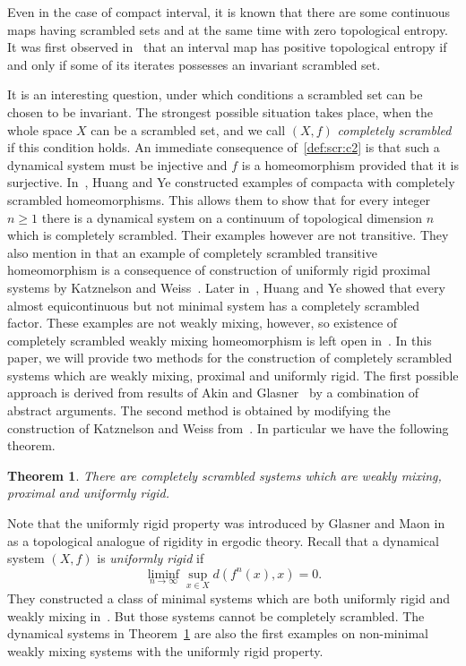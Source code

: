 \documentclass[reqno,a4paper,12pt]{amsart}
\newtheorem{thmx}{Theorem}
\theoremstyle{definition}
\numberwithin{equation}{section}
\begin{document}
Even in the case of compact interval, it is known
that there are some continuous maps having scrambled sets  and at the same time with
zero topological entropy.
It was first observed in~\cite{Du05} that an interval map has positive topological
entropy if and only if some of its iterates possesses an invariant scrambled set.

It is an interesting question, under which conditions a scrambled set can be chosen to be invariant.
The strongest possible situation takes place, when the whole space $X$ can be a scrambled set,
and we call $(X,f)$  \emph{completely scrambled} if this condition holds.
An immediate consequence of~\eqref{def:scr:c2} is that such a dynamical system must be injective and
$f$ is a homeomorphism provided that it is surjective.
In~\cite{HYCS}, Huang and Ye constructed examples of compacta with completely scrambled homeomorphisms.
This allows them to show that for every integer $n\geq 1$
there is a dynamical system on a continuum of topological dimension $n$  which is completely scrambled.
Their examples however are not transitive. They also mention in \cite{HYCS} that an example of completely scrambled
transitive homeomorphism is a consequence of construction of uniformly rigid proximal systems by Katznelson and Weiss~\cite{KW}.
Later in~\cite{HY02}, Huang and Ye showed that
every almost equicontinuous but not minimal system has a completely scrambled factor.
These examples are not weakly mixing, however,
so existence of completely scrambled weakly mixing homeomorphism is left open in~\cite{HYCS}.
In this paper, we will provide two methods for the construction of completely scrambled systems
which are weakly mixing, proximal and uniformly rigid.
The first possible approach is  derived from results of Akin and Glasner~\cite{AG} by
a combination of abstract arguments.
The second method is obtained by modifying the construction of Katznelson and Weiss from~\cite{KW}.
In particular we have the following theorem.

\begin{thmx}\label{thm:A}
There are completely scrambled systems
which are weakly mixing, proximal and uniformly rigid.
\end{thmx}

Note that the uniformly rigid property was introduced by Glasner and Maon in~\cite{GM89} as a topological
analogue of rigidity in ergodic theory.
Recall that a dynamical system $(X,f)$ is \emph{uniformly rigid} if
\[\liminf_{n\to\infty}\sup_{x\in X} d(f^n(x),x)=0.\]
They constructed a class of minimal systems
which are both uniformly rigid and weakly mixing in~\cite{GM89}.
But those systems cannot be completely scrambled.
The dynamical systems in Theorem~\ref{thm:A} are also the first examples on
non-minimal weakly mixing systems with the uniformly rigid property.
\end{document}
